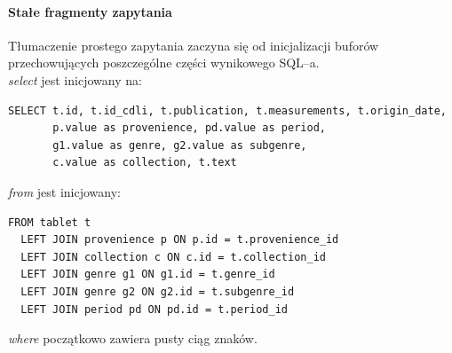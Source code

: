 \paragraph{Stałe fragmenty zapytania}
Tłumaczenie prostego zapytania zaczyna się od inicjalizacji buforów przechowujących poszczególne części wynikowego SQL--a.
\vspace{5pt}\\
\textit{select} jest inicjowany na:
\begin{verbatim}
SELECT t.id, t.id_cdli, t.publication, t.measurements, t.origin_date, 
       p.value as provenience, pd.value as period,
       g1.value as genre, g2.value as subgenre, 
       c.value as collection, t.text
\end{verbatim}
\textit{from} jest inicjowany:
\begin{verbatim}
FROM tablet t
  LEFT JOIN provenience p ON p.id = t.provenience_id
  LEFT JOIN collection c ON c.id = t.collection_id
  LEFT JOIN genre g1 ON g1.id = t.genre_id
  LEFT JOIN genre g2 ON g2.id = t.subgenre_id
  LEFT JOIN period pd ON pd.id = t.period_id
\end{verbatim}
\textit{where} początkowo zawiera pusty ciąg znaków.




